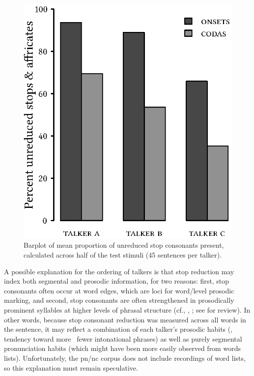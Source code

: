 \begin{figure}[bt]
	\begin{centering}
	\includegraphics{figures/posthocs/ReleaseBursts.eps}
	\caption[Barplot of mean proportion of unreduced stop consonants]{Barplot of mean proportion of unreduced stop consonants present, calculated across half of the test stimuli (45 sentences per talker).\label{fig:ReleaseBursts}}
	\end{centering}
\end{figure}

A possible explanation for the ordering of talkers is that stop reduction may index both segmental and prosodic information, for two reasons: first, stop consonants often occur at word edges, which are loci for word\-/level prosodic marking, and second, stop consonants are often strengthened in prosodically prominent syllables at higher levels of phrasal structure (cf., \eg, \citealt{deJong1995, FougeronKeating1997, ChoEtAl2007, ColeEtAl2007}; see \citealt{Keating2006} for review).  In other words, because stop consonant reduction was measured across all words in the sentence, it may reflect a combination of each talker’s prosodic habits (\ie, tendency toward more \vs\ fewer intonational phrases) as well as purely segmental pronunciation habits (which might have been more easily observed from words lists).  Unfortunately, the \ac{pn/nc} corpus does not include recordings of word lists, so this explanation must remain speculative.

